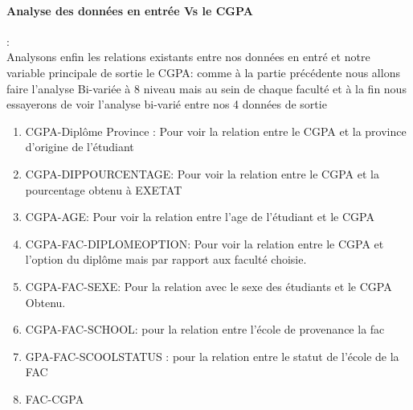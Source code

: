 \paragraph{Analyse des données en entrée Vs le CGPA}:\\
Analysons enfin les relations existants entre nos données en entré et notre variable principale de sortie le \ac{CGPA}: 
comme à la partie précédente nous allons faire l'analyse Bi-variée  à
8 niveau mais au sein de chaque faculté et à la fin nous essayerons de voir l'analyse bi-varié entre nos 4 données de sortie 
\begin{enumerate}
	\item CGPA-Diplôme Province : Pour voir la relation entre le CGPA
	et la province d'origine de l'étudiant
	\item CGPA-DIPPOURCENTAGE: Pour voir
	la relation entre le CGPA et la pourcentage obtenu à \ac{EXETAT}
	\item CGPA-AGE: Pour voir la relation entre l'age de l'étudiant et le CGPA
	\item CGPA-FAC-DIPLOMEOPTION: Pour voir la relation entre le CGPA et l'option
	du diplôme mais par rapport aux faculté choisie.
	\item CGPA-FAC-SEXE: Pour
	la relation avec le sexe des étudiants et le CGPA Obtenu.
	\item  CGPA-FAC-SCHOOL: pour la relation entre l'école de provenance la fac 
	\item GPA-FAC-SCOOLSTATUS : pour la relation entre le statut de l'école de la
	FAC 
	\item FAC-CGPA
\end{enumerate}

